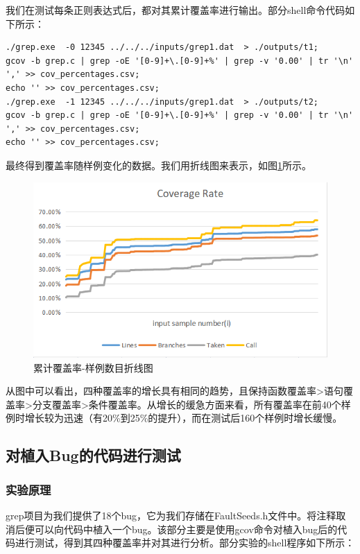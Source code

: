 \documentclass[12pt, a4paper, oneside,bibend=bibtex]{ctexart}
\begin{document}
我们在测试每条正则表达式后，都对其累计覆盖率进行输出。部分shell命令代码如下所示：

\begin{lstlisting}[caption={}]
./grep.exe  -0 12345 ../../../inputs/grep1.dat  > ./outputs/t1;
gcov -b grep.c | grep -oE '[0-9]+\.[0-9]+%' | grep -v '0.00' | tr '\n' ',' >> cov_percentages.csv; 
echo '' >> cov_percentages.csv;
./grep.exe  -1 12345 ../../../inputs/grep1.dat  > ./outputs/t2;
gcov -b grep.c | grep -oE '[0-9]+\.[0-9]+%' | grep -v '0.00' | tr '\n' ',' >> cov_percentages.csv; 
echo '' >> cov_percentages.csv;
\end{lstlisting}

最终得到覆盖率随样例变化的数据。我们用折线图来表示，如图\ref{handleonce2}所示。

\begin{figure}[htbp]
    \centering
    \includegraphics[width=14cm]{images/handleonce2.png}
    \caption{累计覆盖率-样例数目折线图}
    \label{handleonce2}
\end{figure}

从图中可以看出，四种覆盖率的增长具有相同的趋势，且保持函数覆盖率>语句覆盖率>分支覆盖率>条件覆盖率。从增长的缓急方面来看，所有覆盖率在前40个样例时增长较为迅速（有20\%到25\%的提升），而在测试后160个样例时增长缓慢。

\subsection{对植入Bug的代码进行测试}
\subsubsection{实验原理}
grep项目为我们提供了18个bug，它为我们存储在FaultSeeds.h文件中。将注释取消后便可以向代码中植入一个bug。该部分主要是使用gcov命令对植入bug后的代码进行测试，得到其四种覆盖率并对其进行分析。部分实验的shell程序如下所示：
\end{document}
